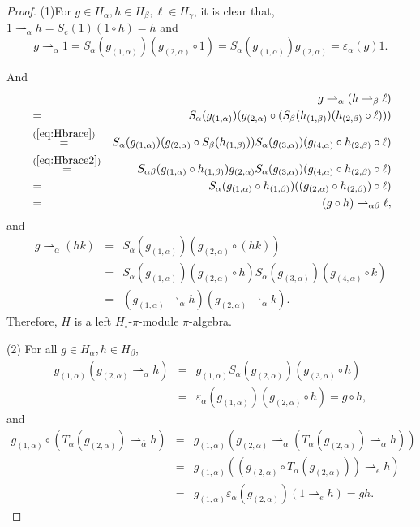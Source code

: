 \documentclass[11pt]{article}
\def\a{\alpha}
\def\b{\beta}
\def\g{\gamma}
\def\v{\varepsilon}
\begin{document}
\begin{proof}
(1)For $g\in H_\a, h\in H_\b,\ell\in H_\g$, it is clear that, $1\rightharpoonup_\a h=S_e(1)(1\circ h)=h$ and 
$$g\rightharpoonup_\a 1=S_\a(g_{(1,\a)})(g_{(2,\a)}\circ 1)=S_\a(g_{(1,\a)})g_{(2,\a)}=\v_\a(g)1.$$

And
\begin{eqnarray*}
& & g \rightharpoonup_\a (h\rightharpoonup_\b\ell )\\
&=& S_\a(g_{(1,\a)}) (g_{(2,\a)}\circ (S_\b(h_{(1,\b)})(h_{(2,\b)}\circ \ell ))) \\
&\overset{(\ref{eq:Hbrace})}{=}& S_\a(g_{(1,\a)}) (g_{(2,\a)}\circ S_\b(h_{(1,\b)})) S_\a(g_{(3,\a)}) (g_{(4,\a)}\circ h_{(2,\b)}\circ \ell ) \\
&\overset{(\ref{eq:Hbrace2})}{=}& S_{\a\b}(g_{(1,\a)}\circ h_{(1,\b)}) g_{(2,\a)} S_\a(g_{(3,\a)}) (g_{(4,\a)}\circ h_{(2,\b)}\circ \ell ) \\
&=& S_{\a}(g_{(1,\a)}\circ h_{(1,\b)}) ((g_{(2,\a)}\circ h_{(2,\b)})\circ \ell ) \\
&=& (g\circ h)\rightharpoonup_{\a\b} \ell ,
\end{eqnarray*}
and
\begin{eqnarray*}
g\rightharpoonup_{\a}(hk) &=& S_\a(g_{(1,\a)}) (g_{(2,\a)}\circ(hk)) \\
 &=& S_\a(g_{(1,\a)}) (g_{(2,\a)}\circ h)S_\a(g_{(3,\a)}) (g_{(4,\a)}\circ k)\\
 &=& (g_{(1,\a)}\rightharpoonup_\a h)(g_{(2,\a)}\rightharpoonup_\a k).
\end{eqnarray*}
Therefore, $H$ is a left $H_{\circ}$-$\pi$-module $\pi$-algebra.

(2) For all $g\in H_\a, h\in H_\b$,
\begin{eqnarray*}
 g_{(1,\a)}(g_{(2,\a)}\rightharpoonup_\a h) 
 &=& g_{(1,\a)}S_\a(g_{(2,\a)})(g_{(3,\a)}\circ h) \\
 &=& \v_\a(g_{(1,\a)})(g_{(2,\a)}\circ h) = g\circ h,
\end{eqnarray*}
and
\begin{eqnarray*}
 g_{(1,\a)}\circ(T_\a(g_{(2,\a)})\rightharpoonup_{\bar{\a}} h) 
 &=& g_{(1,\a)}(g_{(2,\a)}\rightharpoonup_\a(T_\a(g_{(2,\a)})\rightharpoonup_{\a} h)) \\
 &=& g_{(1,\a)}((g_{(2,\a)}\circ T_\a(g_{(2,\a)}))\rightharpoonup_{e} h) \\
 &=& g_{(1,\a)}\v_\a(g_{(2,\a)})(1\rightharpoonup_{e} h) = gh.
\end{eqnarray*}


\end{proof}
\end{document}
